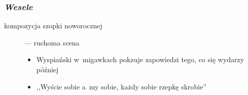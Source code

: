 \subsubsection*{\textit{Wesele}}
\begin{description}
    \item[kompozycja szopki noworocznej] --- ruchoma scena
        \begin{itemize}
            \item Wyspiański w~migawkach pokzuje zapowiedzi tego, co się wydarzy później
            \item ,,Wyście sobie a~my sobie, każdy sobie rzepkę skrobie''
        \end{itemize}
\end{description}